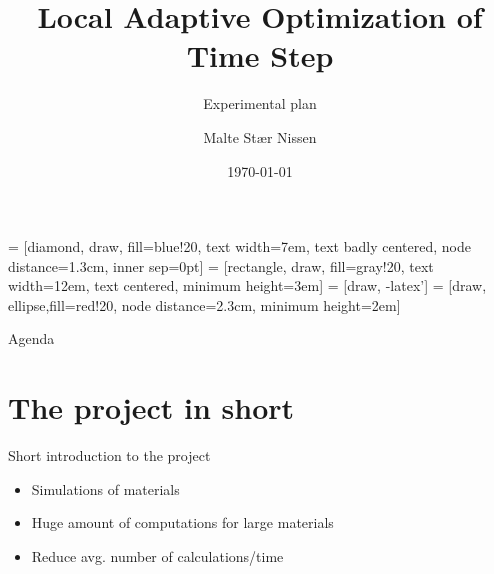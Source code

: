 \usepackage{pslatex}
\usepackage{listing}
\usepackage{caption}
\usepackage{subcaption}
\usepackage{multirow}

\usepackage{etoolbox}%

\usepackage{tikz}
\usetikzlibrary{shapes,arrows}


\usepackage{scalefnt}



\title{Local Adaptive Optimization of Time Step}
\subtitle{Experimental plan}
\author{Malte Stær Nissen}
\date{\today}



 = [diamond, draw, fill=blue!20, 
    text width=7em, text badly centered, node distance=1.3cm, inner sep=0pt]
 = [rectangle, draw, fill=gray!20, 
    text width=12em, text centered, minimum height=3em]
 = [draw, -latex']
 = [draw, ellipse,fill=red!20, node distance=2.3cm, minimum height=2em]

\frame[plain]{\titlepage}

\begin{frame}{Agenda}
	\begin{center}
	\end{center}
\end{frame}

\section{The project in short}
\begin{frame}{Short introduction to the project}
    \begin{itemize}
		\item Simulations of materials
		\item Huge amount of computations for large materials
        \item Reduce avg. number of calculations/time
	\end{itemize}
\end{frame}

